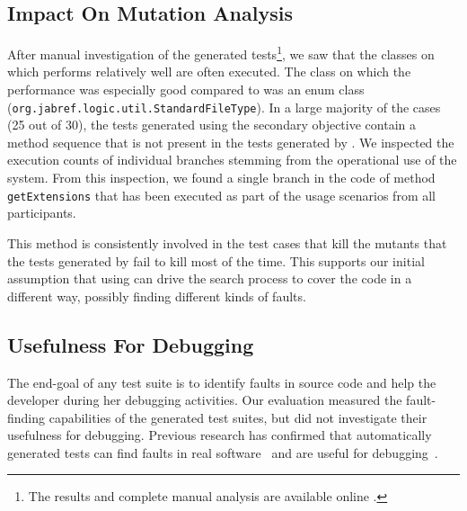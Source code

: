 \subsection{Impact On Mutation Analysis}

After manual investigation of the generated tests\footnote{The results and complete manual analysis are available online \cite{Evers2020, evers_bjorn_2020_3897513, evers_bjorn_2020_3894711}.}, we saw that the classes on which \com performs relatively well are often executed. The class on which the performance was especially good compared to \df was an enum class (\texttt{org.jab\-ref.lo\-gic.util.Stan\-dard\-File\-Type}).
%
In a large majority of the cases (25 out of 30), the tests generated using the \com secondary objective contain a method sequence that is not present in the tests generated by \df.
We inspected the execution counts of individual branches stemming from the operational use of the system. From this inspection, we found a single branch in the code of method \texttt{getExtensions} that has been executed as part of the usage scenarios from all participants. 

This method is consistently involved in the test cases that kill the mutants that the tests generated by \df fail to kill most of the time. 
This supports our initial assumption that using \com can drive the search process to cover the code in a different way, possibly finding different kinds of faults.

\subsection{Usefulness For Debugging}

The end-goal of any test suite is to identify faults in source code and help the developer during her debugging activities. Our evaluation measured the fault-finding capabilities of the generated test suites, but did not investigate their usefulness for debugging. Previous research has confirmed that automatically generated tests can find faults in real software~\cite{almasi2017industrial} and are useful for debugging~\cite{Ceccato2015}. 

